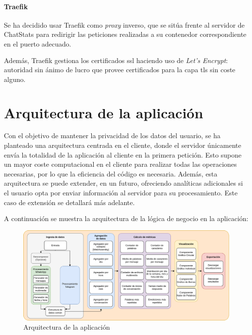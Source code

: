 \paragraph{Traefik} Se ha decidido usar Traefik como \textit{proxy} inverso, que se sitúa frente al servidor de ChatStats para redirigir las peticiones realizadas a su contenedor correspondiente en el puerto adecuado.

Además, Traefik gestiona los certificados \acrshort{ssl} haciendo uso de \textit{Let's Encrypt}: autoridad sin ánimo de lucro que provee certificados para la capa \acrshort{tls} sin coste alguno.








\section{Arquitectura de la aplicación}
\label{chap:architecture:processing}


Con el objetivo de mantener la privacidad de los datos del usuario, se ha planteado una arquitectura centrada en el cliente, donde el servidor únicamente envía la totalidad de la aplicación al cliente en la primera petición. Esto supone un mayor coste computacional en el cliente para realizar todas las operaciones necesarias, por lo que la eficiencia del código es necesaria. Además, esta arquitectura se puede extender, en un futuro, ofreciendo analíticas adicionales si el usuario opta por enviar información al servidor para su procesamiento. Este caso de extensión se detallará más adelante.

A continuación se muestra la arquitectura de la lógica de negocio en la aplicación:

\begin{figure}[H]
	\centering
	\includegraphics[width=\textwidth]{img/architecture_processing.png}
	\caption{Arquitectura de la aplicación}
	\label{fig:chap4:architecture_processing}
\end{figure}


